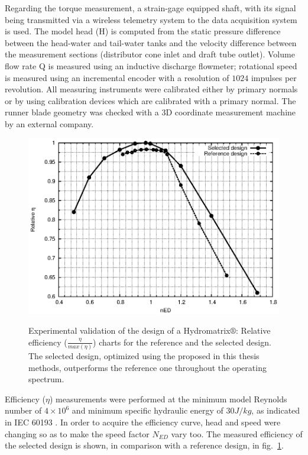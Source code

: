 Regarding the torque measurement, a strain-gage equipped shaft, with its signal being transmitted via a wireless telemetry system to the data acquisition system is used. The model head (H) is computed from the static pressure difference between the head-water and tail-water tanks and the velocity difference between the measurement sections (distributor cone inlet and draft tube outlet). Volume flow rate Q is measured using an inductive discharge flowmeter; rotational speed is measured using an incremental encoder with a resolution of $1024$ impulses per revolution. All measuring instruments were calibrated either by primary normals or by using calibration devices which are calibrated with a primary normal. The runner blade geometry was checked with a 3D coordinate measurement machine by an external company.

\begin{figure}[h!]
\centering
\resizebox*{13.0cm}{!}
{\includegraphics[width=1\textwidth]{./3obj6/Eff.eps}}
\caption{Experimental validation of the design of a Hydromatrix$\circledR$: Relative efficiency ($\frac{\eta}{max(\eta)}$) charts for the reference and the selected design. The selected design, optimized using the proposed in this thesis methods, outperforms the reference one throughout the operating spectrum.}
\label{exp.eff}
\end{figure}


Efficiency ($\eta$) measurements were performed at the minimum model Reynolds number of $4 × 10^6$ and minimum specific hydraulic energy of $30J/kg$, as indicated in IEC 60193 \cite{IEC}.
In order to acquire the efficiency curve, head and speed were changing so as to make the speed factor $N_{ED}$ vary too.  The measured efficiency of the selected design is shown, in comparison with a reference design, in fig.\ \ref{exp.eff}.    

